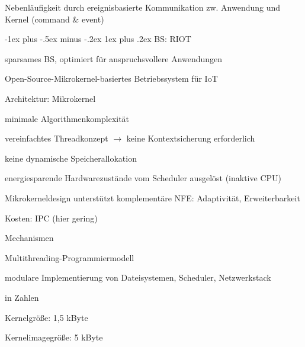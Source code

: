 \documentclass[a4paper]{article}
\makeatletter
\renewcommand{\subsubsection}{\@startsection{subsubsection}{3}{0mm}%
 {-1ex plus -.5ex minus -.2ex}%
 {1ex plus .2ex}%
 {\normalfont\small\bfseries}}
\makeatother
\begin{document}
\begin{multicols}{3}
\begin{itemize*}
\begin{itemize*}
            \item Nebenläufigkeit durch ereignisbasierte Kommunikation zw. Anwendung und Kernel (command \& event)
        \end{itemize*}
    \end{itemize*}

    \subsubsection{BS: RIOT}
    \begin{itemize*}
        \item sparsames BS, optimiert für anspruchsvollere Anwendungen
        \item Open-Source-Mikrokernel-basiertes Betriebssystem für IoT
        \item Architektur: Mikrokernel
        \begin{itemize*}
                \item minimale Algorithmenkomplexität
                \item vereinfachtes Threadkonzept $\rightarrow$ keine Kontextsicherung erforderlich
                \item keine dynamische Speicherallokation
                \item energiesparende Hardwarezustände vom Scheduler ausgelöst (inaktive CPU)
            \item Mikrokerneldesign unterstützt komplementäre NFE: Adaptivität, Erweiterbarkeit
            \item Kosten: IPC (hier gering)
        \end{itemize*}
        \item Mechanismen
        \begin{itemize*}
            \item Multithreading-Programmiermodell
            \item modulare Implementierung von Dateisystemen, Scheduler, Netzwerkstack
        \end{itemize*}
        \item in Zahlen
        \begin{itemize*}
            \item Kernelgröße: 1,5 kByte
            \item Kernelimagegröße: 5 kByte
        \end{itemize*}
    \end{itemize*}


\end{multicols}
\end{document}
